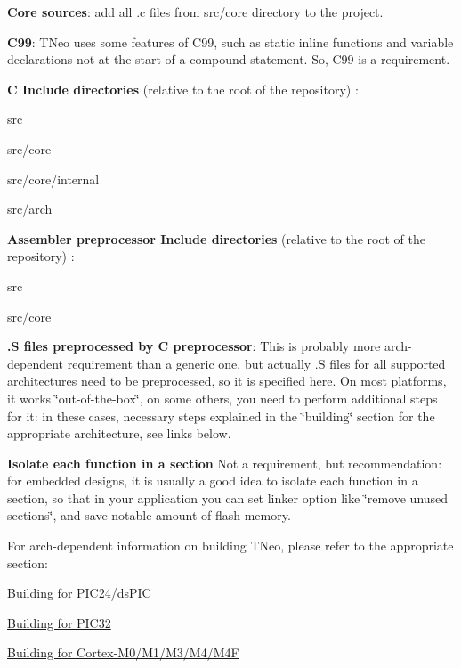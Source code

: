 \begin{DoxyItemize}
\item {\bfseries Core sources}\+: add all {\ttfamily .c} files from {\ttfamily src/core} directory to the project.
\item {\bfseries C99}\+: T\+Neo uses some features of C99, such as {\ttfamily static inline} functions and variable declarations not at the start of a compound statement. So, C99 is a requirement.
\item {\bfseries C Include directories} (relative to the root of the repository) \+:
\begin{DoxyItemize}
\item {\ttfamily src}
\item {\ttfamily src/core}
\item {\ttfamily src/core/internal}
\item {\ttfamily src/arch}
\end{DoxyItemize}
\item {\bfseries Assembler preprocessor Include directories} (relative to the root of the repository) \+:
\begin{DoxyItemize}
\item {\ttfamily src}
\item {\ttfamily src/core}
\end{DoxyItemize}
\item {\bfseries {\ttfamily .S} files preprocessed by C preprocessor}\+: This is probably more arch-\/dependent requirement than a generic one, but actually {\ttfamily .S} files for all supported architectures need to be preprocessed, so it is specified here. On most platforms, it works \char`\"{}out-\/of-\/the-\/box\char`\"{}, on some others, you need to perform additional steps for it\+: in these cases, necessary steps explained in the \char`\"{}building\char`\"{} section for the appropriate architecture, see links below.
\item {\bfseries Isolate each function in a section} Not a requirement, but recommendation\+: for embedded designs, it is usually a good idea to isolate each function in a section, so that in your application you can set linker option like \char`\"{}remove unused sections\char`\"{}, and save notable amount of flash memory.
\end{DoxyItemize}

For arch-\/dependent information on building T\+Neo, please refer to the appropriate section\+:


\begin{DoxyItemize}
\item \hyperlink{arch_specific_pic24_building}{Building for P\+I\+C24/ds\+P\+IC}
\item \hyperlink{arch_specific_pic32_building}{Building for P\+I\+C32}
\item \hyperlink{arch_specific_cortex_m_building}{Building for Cortex-\/\+M0/\+M1/\+M3/\+M4/\+M4F} 
\end{DoxyItemize}